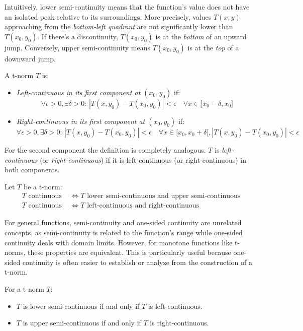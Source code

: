     Intuitively, lower semi-continuity means that the function's value does not have an isolated peak relative to its surroundings. More precisely, values $T(x,y)$ approaching from the \emph{bottom-left quadrant} are not significantly lower than $T(x_0,y_0)$. If there's a discontinuity, $T(x_0,
    y_0)$ is at the \emph{bottom} of an upward jump. Conversely, upper 
    semi-continuity means $T(x_0,y_0)$ is at the \emph{top} of a downward 
    jump.

\begin{definition}
A t-norm $T$ is:
\begin{itemize}
    \item \emph{Left-continuous in its first component at $(x_0,y_0)$} if:
    \[
    \forall \epsilon > 0, \exists \delta > 0 : \, |T(x,y_0) - T(x_0,y_0)| < \epsilon \quad \forall x \in ]x_0-\delta, x_0]
    \]
    \item \emph{Right-continuous in its first component at $(x_0,y_0)$} if:
    \[
    \forall \epsilon > 0, \exists \delta > 0 :\, |T(x,y_0) - T(x_0,y_0)| < \epsilon \quad \forall x \in [x_0, x_0+\delta[, |T(x,y_0) - T(x_0,y_0)| < \epsilon
    \]
\end{itemize}
For the second component the definition is completely analogous.
$T$ is \emph{left-continuous} (or \emph{right-continuous}) if it is left-continuous (or right-continuous) in both components.
\end{definition}

\begin{remark}
    Let $T$ be a t-norm:
      \begin{align*}
        T \text{ continuous } &\Leftrightarrow T \text{ lower semi-continuous and upper semi-continuous} \\
        T \text{ continuous } &\Leftrightarrow T \text{ left-continuous and right-continuous}
      \end{align*}
\end{remark}


For general functions, semi-continuity and one-sided continuity are unrelated concepts, as semi-continuity is related to the function's range while one-sided continuity deals with domain limits. However, for monotone functions like t-norms, these properties are equivalent. This is particularly useful because one-sided continuity is often easier to establish or analyze from the construction of a t-norm.\\
\begin{proposition}
For a t-norm $T$:
\begin{itemize}
    \item $T$ is lower semi-continuous if and only if $T$ is left-continuous.
    \item $T$ is upper semi-continuous if and only if $T$ is right-continuous.
\end{itemize}
\end{proposition}

